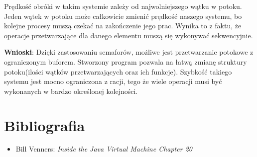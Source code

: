 \documentclass[11pt]{article}
\begin{document}
Prędkość obróki w takim systemie zależy od najwolniejszego wątku w potoku.
Jeden wątek w potoku może całkowicie zmienić prędkość naszego systemu,
bo kolejne procesy muszą czekać na zakończenie jego prac. Wynika to z faktu, że
operacje przetwarzające dla danego elementu muszą się wykonywać sekwencyjnie.

\textbf{Wnioski}: Dzięki zastosowaniu semaforów, możliwe jest przetwarzanie potokowe z
ograniczonym buforem. Stworzony program pozwala na łatwą zmianę struktury
potoku(ilości wątków przetwarzających oraz ich funkcje). Szybkość takiego
systemu jest mocno ograniczona z racji, tego że wiele operacji musi być
wykonanych w bardzo określonej kolejności.
\section*{Bibliografia}
\label{sec:org1cc1d38}
\begin{itemize}
\item Bill Venners: \emph{Inside the Java Virtual Machine Chapter 20}
\end{itemize}
\end{document}
